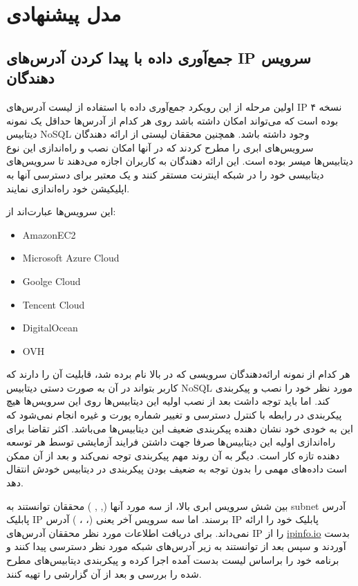 \documentclass[10pt, a4paper]{article}
\begin{document}
\newpage

\section{مدل پیشنهادی}

\subsection{جمع‌آوری داده با پیدا کردن آدرس‌های IP سرویس دهندگان}

اولین مرحله از این رویکرد جمع‌آوری داده با استفاده از لیست آدرس‌های IP نسخه ۴
بوده است که می‌تواند امکان داشته باشد روی هر کدام از آدرس‌ها حداقل یک نمونه
دیتابیس NoSQL وجود داشته باشد. همچنین محققان لیستی از ارائه دهندگان سرویس‌های
ابری را مطرح کردند که در آنها امکان نصب و راه‌اندازی این نوع دیتابیس‌ها میسر
بوده است. این ارائه دهندگان به کاربران اجازه می‌دهند تا سرویس‌های دیتابیسی خود
را در شبکه اینترنت مستقر کنند و یک  معتبر برای دسترسی آنها
به اپلیکیشن‌ خود راه‌اندازی نمایند.

این سرویس‌ها عبارت‌اند از:

\begin{LTR}
    \begin{itemize}
        \item AmazonEC2
        \item Microsoft Azure Cloud
        \item Goolge Cloud
        \item Tencent Cloud
        \item DigitalOcean
        \item OVH
    \end{itemize}
\end{LTR}

هر کدام از نمونه ارائه‌دهندگان سرویسی که در بالا نام برده شد، قابلیت آن را دارند
که کاربر بتواند در آن به صورت دستی دیتابیس NoSQL مورد نظر خود را نصب و پیکربندی
کند. اما باید توجه داشت بعد از نصب اولیه این دیتابیس‌ها روی این سرویس‌ها هیچ
پیکربندی در رابطه با کنترل دسترسی و تغییر شماره پورت و غیره انجام نمی‌شود که این
به خودی خود نشان دهنده پیکربندی ضعیف این دیتابیس‌ها می‌باشد. اکثر تقاضا برای
راه‌اندازی اولیه این دیتابیس‌ها صرفا جهت داشتن فرایند آزمایشی توسط هر توسعه
دهنده تازه کار است. دیگر به آن روند مهم پیکربندی توجه نمی‌کند و بعد از آن ممکن
است داده‌های مهمی را بدون توجه به ضعیف بودن پیکربندی در دیتابیس خودش انتقال دهد.

بین شش  سرویس ابری بالا، از سه مورد آنها (, , ) محققان توانستند به subnet آدرس پابلیک IP برسند.  اما
سه سرویس آخر یعنی (، ، ) آدرس IP
پابلیک خود را ارائه نمی‌داند.  برای دریافت اطلاعات مورد نظر محققان آدرس‌های IP
را از \href{https://ipinfo.io}{ipinfo.io} بدست آوردند و سپس بعد از توانستند به
زیر آدرس‌های شبکه مورد نظر دسترسی پیدا کنند و برنامه خود را براساس لیست بدست
آمده اجرا کرده و پیکربندی دیتابیس‌های مطرح شده را بررسی و بعد از آن گزارشی را
تهیه کنند.
\end{document}
